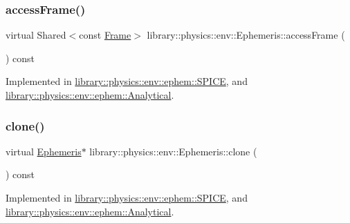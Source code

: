 \subsubsection{\texorpdfstring{access\+Frame()}{accessFrame()}}
{\footnotesize\ttfamily virtual Shared$<$const \hyperlink{classlibrary_1_1physics_1_1coord_1_1_frame}{Frame}$>$ library\+::physics\+::env\+::\+Ephemeris\+::access\+Frame (\begin{DoxyParamCaption}{ }\end{DoxyParamCaption}) const\hspace{0.3cm}{\ttfamily [pure virtual]}}



Implemented in \hyperlink{classlibrary_1_1physics_1_1env_1_1ephem_1_1_s_p_i_c_e_a20b94d4f05b17a2eb3ba986464da44a8}{library\+::physics\+::env\+::ephem\+::\+S\+P\+I\+CE}, and \hyperlink{classlibrary_1_1physics_1_1env_1_1ephem_1_1_analytical_ad16f575a7804bd29710030289d5630b1}{library\+::physics\+::env\+::ephem\+::\+Analytical}.

\mbox{\label{classlibrary_1_1physics_1_1env_1_1_ephemeris_a7ddecd88d91f79ff204100eb9607b591}} 
\subsubsection{\texorpdfstring{clone()}{clone()}}
{\footnotesize\ttfamily virtual \hyperlink{classlibrary_1_1physics_1_1env_1_1_ephemeris}{Ephemeris}$\ast$ library\+::physics\+::env\+::\+Ephemeris\+::clone (\begin{DoxyParamCaption}{ }\end{DoxyParamCaption}) const\hspace{0.3cm}{\ttfamily [pure virtual]}}



Implemented in \hyperlink{classlibrary_1_1physics_1_1env_1_1ephem_1_1_s_p_i_c_e_a7d397f5472ec2e14d85fa493cb7c9ae0}{library\+::physics\+::env\+::ephem\+::\+S\+P\+I\+CE}, and \hyperlink{classlibrary_1_1physics_1_1env_1_1ephem_1_1_analytical_acd51ca99177b1433b6623829ae003bec}{library\+::physics\+::env\+::ephem\+::\+Analytical}.

\mbox{\label{classlibrary_1_1physics_1_1env_1_1_ephemeris_abf61a03e24dd146199381db14d1d7c68}} 
